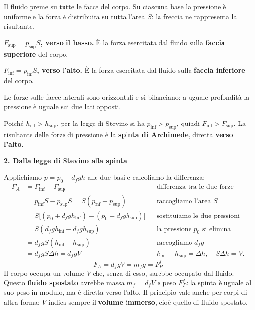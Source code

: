 \documentclass[11pt,a4paper]{article}
\begin{document}
\begin{minipage}[c]{0.58\textwidth}
Il fluido preme su tutte le facce del corpo.
Su ciascuna base la pressione è uniforme e la forza è distribuita
su tutta l'area $S$: la freccia ne rappresenta la risultante.

\textbf{$F_{\mathrm{sup}}=p_{\mathrm{sup}}S$, verso il basso.} È la forza esercitata dal fluido
sulla \textbf{faccia superiore} del corpo.

\textbf{$F_{\mathrm{inf}}=p_{\mathrm{inf}}S$, verso l'alto.} È la forza esercitata dal fluido
sulla \textbf{faccia inferiore} del corpo.

Le forze sulle facce laterali sono orizzontali e si bilanciano:
a uguale profondità la pressione è uguale sui due lati opposti.

Poiché $h_{\mathrm{inf}}>h_{\mathrm{sup}}$, per la legge di Stevino si ha $p_{\mathrm{inf}}>p_{\mathrm{sup}}$,
quindi $F_{\mathrm{inf}}>F_{\mathrm{sup}}$. La risultante delle forze di pressione è
la \textbf{spinta di Archimede}, diretta \textbf{verso l'alto}.
\end{minipage}

\vspace{5pt}
{\large\bfseries 2. Dalla legge di Stevino alla spinta}

Applichiamo $p=p_0+d_fgh$ alle due basi e calcoliamo la differenza:
\begin{align*}
 F_A &= F_{\mathrm{inf}}-F_{\mathrm{sup}}
 && \text{differenza tra le due forze}\\[2pt]
 &= p_{\mathrm{inf}}S-p_{\mathrm{sup}}S=S(p_{\mathrm{inf}}-p_{\mathrm{sup}})
 && \text{raccogliamo l'area }S\\[2pt]
 &=S\bigl[(p_0+d_fgh_{\mathrm{inf}})-(p_0+d_fgh_{\mathrm{sup}})\bigr]
 && \text{sostituiamo le due pressioni}\\[2pt]
 &=S(d_fgh_{\mathrm{inf}}-d_fgh_{\mathrm{sup}})
 && \text{la pressione }p_0\text{ si elimina}\\[2pt]
 &=d_fgS(h_{\mathrm{inf}}-h_{\mathrm{sup}})
 && \text{raccogliamo }d_fg\\[2pt]
 &=d_fgS\Delta h=d_fgV
 && h_{\mathrm{inf}}-h_{\mathrm{sup}}=\Delta h,\quad S\Delta h=V.
\end{align*}
\vspace{-4pt}
\[
 \boxed{\;F_A=d_fgV=m_fg=F_P^{f}\;}
\]
Il corpo occupa un volume $V$ che, senza di esso, sarebbe occupato dal fluido.
Questo \textbf{fluido spostato} avrebbe massa $m_f=d_fV$ e peso $F_P^{f}$:
la spinta è uguale al suo peso in modulo, ma è diretta verso l'alto.
Il principio vale anche per corpi di altra forma;
$V$ indica sempre il \textbf{volume immerso}, cioè quello di fluido spostato.
\end{document}
